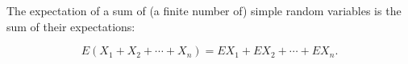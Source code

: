 The expectation of a sum of (a finite number of) simple random variables is the sum of their expectations:

$$E(X_1 + X_2 + \cdots + X_n) = EX_1 + EX_2 + \cdots + EX_n.$$
